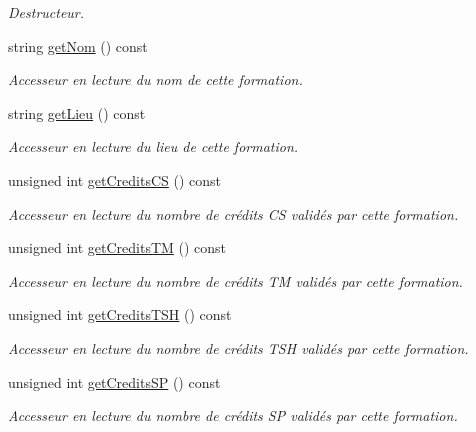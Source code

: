 \begin{DoxyCompactItemize}
\begin{DoxyCompactList}\small\item\em Destructeur. \end{DoxyCompactList}\item 
string \hyperlink{class_formation_exterieure_a5051dbbbad4ac513e6947f8ec230629b}{get\-Nom} () const 
\begin{DoxyCompactList}\small\item\em Accesseur en lecture du nom de cette formation. \end{DoxyCompactList}\item 
string \hyperlink{class_formation_exterieure_a6ad4f9c7f6a74910dabe2df5be3a2583}{get\-Lieu} () const 
\begin{DoxyCompactList}\small\item\em Accesseur en lecture du lieu de cette formation. \end{DoxyCompactList}\item 
unsigned int \hyperlink{class_formation_exterieure_a10ae8cef1659fc8baec652f568f48008}{get\-Credits\-C\-S} () const 
\begin{DoxyCompactList}\small\item\em Accesseur en lecture du nombre de crédits C\-S validés par cette formation. \end{DoxyCompactList}\item 
unsigned int \hyperlink{class_formation_exterieure_a3ddcc11233eeac50dfe97124f2d7075f}{get\-Credits\-T\-M} () const 
\begin{DoxyCompactList}\small\item\em Accesseur en lecture du nombre de crédits T\-M validés par cette formation. \end{DoxyCompactList}\item 
unsigned int \hyperlink{class_formation_exterieure_abb62cc93c6853995a085d141f79d013f}{get\-Credits\-T\-S\-H} () const 
\begin{DoxyCompactList}\small\item\em Accesseur en lecture du nombre de crédits T\-S\-H validés par cette formation. \end{DoxyCompactList}\item 
unsigned int \hyperlink{class_formation_exterieure_ad9ddc5b335cb8cee7e86c8f83534112c}{get\-Credits\-S\-P} () const 
\begin{DoxyCompactList}\small\item\em Accesseur en lecture du nombre de crédits S\-P validés par cette formation. \end{DoxyCompactList}\item 

\end{DoxyCompactItemize}

